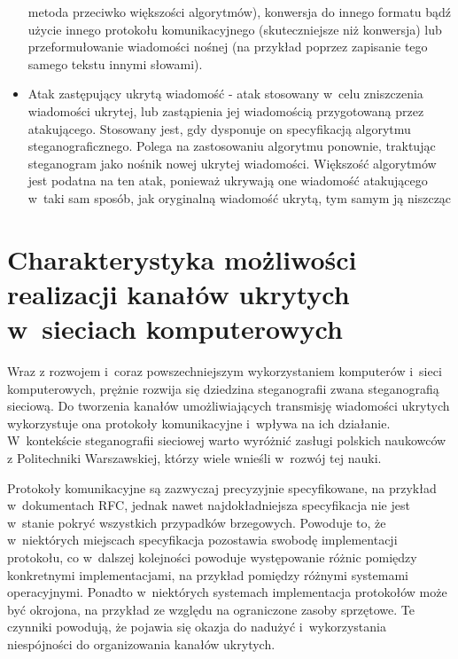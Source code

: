 \documentclass[a4paper, twoside, 12pt]{report}
\begin{document}
\begin{itemize}
                metoda przeciwko większości algorytmów), konwersja do innego formatu
                bądź użycie innego protokołu komunikacyjnego (skuteczniejsze niż konwersja) lub
                przeformułowanie wiadomości nośnej (na przykład poprzez zapisanie tego samego tekstu
                innymi słowami).
            \item Atak zastępujący ukrytą wiadomość - atak stosowany w~celu zniszczenia
                wiadomości ukrytej, lub zastąpienia jej wiadomością przygotowaną przez atakującego.
                Stosowany jest, gdy dysponuje on specyfikacją algorytmu steganograficznego.
                Polega na zastosowaniu algorytmu ponownie, traktując steganogram jako nośnik
                nowej ukrytej wiadomości. Większość algorytmów jest podatna na ten
                atak, ponieważ ukrywają one wiadomość atakującego w~taki sam sposób,
                jak oryginalną wiadomość ukrytą, tym samym ją niszcząc
        \end{itemize}


\chapter{Charakterystyka możliwości realizacji kanałów ukrytych w~sieciach komputerowych}
    Wraz z rozwojem i~coraz powszechniejszym wykorzystaniem komputerów i~sieci
    komputerowych, prężnie rozwija się dziedzina steganografii zwana steganografią
    sieciową. Do tworzenia kanałów umożliwiających transmisję wiadomości ukrytych
    wykorzystuje ona protokoły komunikacyjne i~wpływa na ich działanie. W~kontekście
    steganografii sieciowej warto wyróżnić zasługi polskich naukowców z Politechniki
    Warszawskiej, którzy wiele wnieśli w~rozwój tej nauki\cite{STEGANOGRAFIASIECIOWAART}.

    Protokoły komunikacyjne są zazwyczaj
    precyzyjnie specyfikowane, na przykład w~dokumentach RFC, jednak nawet najdokładniejsza
    specyfikacja nie jest w~stanie pokryć wszystkich przypadków brzegowych. Powoduje
    to, że w~niektórych miejscach specyfikacja pozostawia swobodę implementacji protokołu,
    co w~dalszej kolejności powoduje występowanie różnic pomiędzy konkretnymi
    implementacjami, na przykład pomiędzy różnymi systemami operacyjnymi. Ponadto
    w~niektórych systemach implementacja protokołów może być okrojona, na przykład
    ze względu na ograniczone zasoby sprzętowe. Te czynniki
    powodują, że pojawia się okazja do nadużyć i~wykorzystania niespójności do organizowania
    kanałów ukrytych.
\end{document}
